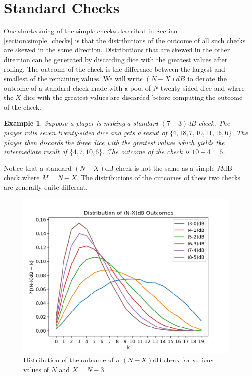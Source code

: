 \documentclass{scrartcl}
\newtheorem{example}{Example}
\begin{document}
\section{Standard Checks}
One shortcoming of the simple checks described in Section \ref{section:simple_checks} is that the distributions of the outcome of all such checks are skewed in the same direction. Distributions that are skewed in the other direction can be generated by discarding dice with the greatest values after rolling. The outcome of the check is the difference between the largest and smallest of the remaining values. We will write $(N-X)dB$ to denote the outcome of a standard check made with a pool of $N$ twenty-sided dice and where the $X$ dice with the greatest values are discarded before computing the outcome of the check.

\begin{example}
Suppose a player is making a standard $(7-3)$dB check.  The player rolls seven twenty-sided dice and gets a result of $\{4, 18, 7, 10, 11, 15, 6\}$.  The player then discards the three dice with the greatest values which yields the intermediate result of $\{4, 7, 10, 6\}$.   The outcome of the check is $10-4 = 6$.
\end{example}

Notice that a standard $(N-X)$dB check is not the same as a simple $M$dB check where $M = N-X$. The distributions of the outcomes of these two checks are generally quite different. 

\begin{figure}[ht]
\centering
\includegraphics[scale=0.8]{discard_distributions.png}
\caption{Distribution of the outcome of a $(N-X)\text{dB}$ check for various values of $N$ and $X = N-3$.}
\end{figure}
\end{document}
